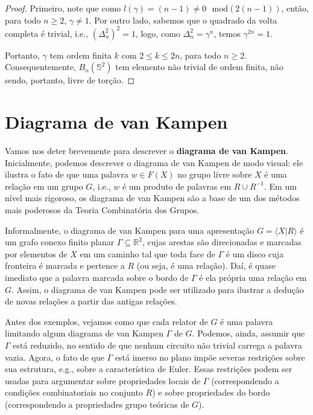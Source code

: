 	\begin{proof}
		Primeiro, note que como $l(\gamma) = (n-1)\neq0\text{ }\mathrm{mod}(2(n-1))$, então, para todo $n\geq2$, $\gamma\neq1$. Por outro lado, sabemos que o quadrado da volta completa é trivial, i.e., $(\Delta_n^2)^2 = 1$, logo, como $\Delta_n^2 = \gamma^n$, temos $\gamma^{2n} = 1$.
		\par\vspace{0.3cm} Portanto, $\gamma$ tem ordem finita $k$ com $2\leq k\leq 2n$, para todo $n\geq 2$. Consequentemente, $B_n(\mathbb{S}^2)$ tem elemento não trivial de ordem finita, não sendo, portanto, livre de torção.
	\end{proof}
	
	\section{Diagrama de van Kampen}
	\hspace{12pt} Vamos nos deter brevemente para descrever o \textbf{diagrama de van Kampen}. Inicialmente, podemos descrever o diagrama de van Kampen de modo visual: ele ilustra o fato de que uma palavra $w\in F(X)$ no grupo livre sobre $X$ é uma relação em um grupo $G$, i.e., $w$ é um produto de palavras em $R\cup R^{-1}$. Em um nível mais rigoroso, os diagrama de van Kampen são a base de um dos métodos mais poderosos da Teoria Combinatória dos Grupos.
	\par\vspace{0.3cm} Informalmente, o diagrama de van Kampen para uma apresentação $G = \langle X|R \rangle$ é um grafo conexo finito planar $\Gamma\subseteq\mathbb{R}^2$, cujas arestas são direcionadas e marcadas por elementos de $X$ em um caminho tal que toda face de $\Gamma$ é um disco cuja fronteira é marcada e pertence a $R$ (ou seja, é uma relação). Daí, é quase imediato que a palavra marcada sobre o bordo de $\Gamma$ é ela própria uma relação em $G$. Assim, o diagrama de van Kampen pode ser utilizado para ilustrar a dedução de novas relações a partir das antigas relações.
	\par\vspace{0.3cm} Antes dos exemplos, vejamos como que cada relator de $G$ é uma palavra limitando algum diagrama de van Kampen $\Gamma$ de $G$. Podemos, ainda, assumir que $\Gamma$ está reduzido, no sentido de que nenhum circuito não trivial carrega a palavra vazia. Agora, o fato de que $\Gamma$ está imerso no plano impõe severas restrições sobre sua estrutura, e.g., sobre a característica de Euler. Essas restrições podem ser usadas para argumentar sobre propriedades locais de $\Gamma$ (correspondendo a condições combinatoriais no conjunto $R$) e sobre propriedades do bordo (correspondendo a propriedades grupo teóricas de $G$).
